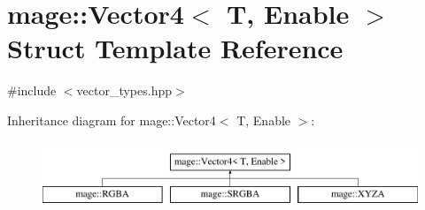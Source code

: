 \hypertarget{structmage_1_1_vector4}{}\section{mage\+:\+:Vector4$<$ T, Enable $>$ Struct Template Reference}
\label{structmage_1_1_vector4}


{\ttfamily \#include $<$vector\+\_\+types.\+hpp$>$}

Inheritance diagram for mage\+:\+:Vector4$<$ T, Enable $>$\+:\begin{figure}[H]
\begin{center}
\leavevmode
\includegraphics[height=2.000000cm]{structmage_1_1_vector4}
\end{center}
\end{figure}
